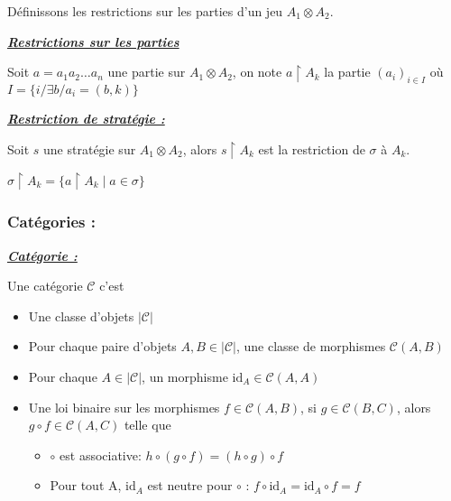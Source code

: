 \documentclass[a4paper,12ptCOUCOU
]{article}
\newlength{\mydepth}
\newlength{\myheight}
\newenvironment{answer}
{\par\begin{lrbox}{\mybox}\quad\begin{minipage}{\linewidth}\color{black}\setlength{\parskip}{10pt plus 1pt minus 1pt}\vspace*{-.7\baselineskip}}
{\end{minipage}\end{lrbox}
\settodepth{\mydepth}{\usebox{\mybox}}
\settoheight{\myheight}{\usebox{\mybox}}
\addtolength{\myheight}{\mydepth}
\noindent\makebox[0pt]{
  \color{gray}\hspace{-0pt}\rule[-\mydepth]{1pt}{\myheight}}
\usebox{\mybox}
  }
\begin{document}
Définissons les restrictions sur les parties d'un jeu $A_1 \otimes A_2$.

\vspace{0.4cm}\begin{minipage}{\linewidth}\textbf{\textit{\underline{ Restrictions sur les parties }}} \begin{answer}
Soit $a = a_1 a_2 \dots a_n$ une partie sur $A_1 \otimes A_2$,
on note $a \upharpoonright A_k$ la partie $(a_i)_{i \in I}$ où
$I = \{i / \exists b / a_i = (b,k)\}$


\end{answer}\end{minipage}

\vspace{0.4cm}\begin{minipage}{\linewidth}\textbf{\textit{\underline{ Restriction de stratégie : }}} \begin{answer}
Soit $s$ une stratégie sur $A_1 \otimes A_2$, alors $s\upharpoonright A_k$ est la
restriction de $\sigma$ à $A_k$.

$\sigma \upharpoonright A_k = \{a\upharpoonright A_k \mid a \in \sigma\}$

\end{answer}\end{minipage}

\subsubsection{Catégories :}

\vspace{0.4cm}\begin{minipage}{\linewidth}\textbf{\textit{\underline{ Catégorie : }}} \begin{answer}
Une catégorie $\mathcal{C}$ c'est
\begin{itemize}
\item Une classe d'objets $|\mathcal{C}|$

\item Pour chaque paire d'objets $A, B \in |\mathcal{C}|$, une classe de
morphismes $\mathcal{C}(A,B)$

\item Pour chaque $A \in |\mathcal{C}|$, un morphisme
$\text{id}_A \in \mathcal{C}(A,A)$

\item Une loi binaire sur les morphismes
$f \in \mathcal{C}(A,B)$, si $g \in \mathcal{C}(B,C)$, alors
$g \circ f \in \mathcal{C}(A,C)$
telle que
\begin{itemize}
\item $\circ$ est associative:
$h \circ (g \circ f) = (h \circ g) \circ f$

\item Pour tout A, $\text{id}_A$ est neutre pour $\circ$ :
$f \circ \text{id}_A = \text{id}_A \circ f = f$
\end{itemize}
\end{itemize}

\end{answer}\end{minipage}
\end{document}

